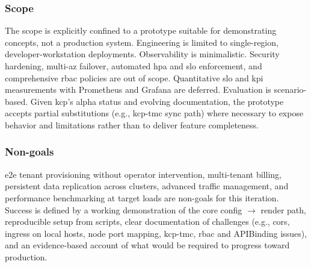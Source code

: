 \documentclass[11pt, a4paper, oneside, listof=totoc]{scrartcl}
\begin{document}
            \subsubsection{Scope}\label{subsubsec:scope}
                The scope is explicitly confined to a prototype suitable for demonstrating concepts,
                not a production system.
                Engineering is limited to single-region, developer-workstation deployments.
                Observability is minimalistic.
                Security hardening, multi-\gls{az} failover, automated \gls{hpa} and \gls{slo}
                enforcement, and comprehensive \gls{rbac} policies are out of scope.
                Quantitative \gls{slo} and \gls{kpi} measurements with Prometheus and Grafana are
                deferred.
                Evaluation is scenario-based.
                Given \gls{kcp}'s alpha status and evolving documentation, the prototype accepts
                partial substitutions (e.g., \gls{kcp}-\gls{tmc} sync path) where necessary to
                expose behavior and limitations rather than to deliver feature completeness.

            \subsubsection{Non-goals}\label{subsubsec:nongoals}
                \gls{e2e} tenant provisioning without operator intervention, multi-tenant billing,
                persistent data replication across clusters, advanced traffic management,
                and performance benchmarking at target loads are non-goals for this iteration.\\
                Success is defined by a working demonstration of the core config $\rightarrow$
                render path, reproducible setup from scripts, clear documentation of challenges
                (e.g., \gls{cors}, ingress on local hosts, node port mapping, \gls{kcp}-\gls{tmc},
                \gls{rbac} and APIBinding issues), and an evidence-based account of what would be
                required to progress toward production.
\end{document}
